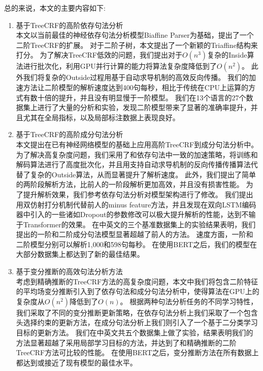总的来说，本文的主要内容如下:
\begin{enumerate}
	\item 基于TreeCRF的高阶依存句法分析\\
	      \indent 本文以当前最佳的神经依存句法分析模型Biaffine Parser为基础，提出了一个二阶TreeCRF的扩展。
	      对于二阶子树，本文提出了一个新颖的Triaffine结构来打分。
	      为了解决TreeCRF低效的问题，我们提出对于$O(n^3)$复杂的Inside算法进行批次化，利用GPU并行计算的能力将算法复杂度降低到了$O(n^2)$。
	      此外我们将复杂的Outside过程用基于自动求导机制的高效反向传播。
	      我们的加速方法让二阶模型的解析速度达到400句每秒，相比于传统在CPU上运算的方式有数十倍的提升，并且没有明显慢于一阶模型。
	      我们在13个语言的27个数据集上进行了大量的分析和实验，发现二阶模型带来了显著的准确率提升，并且尤其在全局指标，以及局部标注数据上表现良好。
	\item 基于TreeCRF的高阶成分句法分析\\
	      \indent 本文提出在已有神经网络模型的基础上应用高阶TreeCRF到成分句法分析中。
	      为了解决高复杂度问题，我们采用了和依存句法中一致的加速策略，将训练和解码算法进行了高度批次化，并且用支持自动求导机制的反向传播传播算法代替了复杂的Outside算法，从而显著提升了解析速度。
	      此外，我们提出了简单的两阶段解析方法，比前人的一阶段解析更加高效，并且没有损害性能。
	      为了提升解析效果，我们参考依存句法分析对模型架构进行了修改。
	      我们提出用双仿射打分机制代替前人的minus feature方法，并且发现在双向LSTM编码器中引入的一些诸如Dropout的参数修改可以极大提升解析的性能，达到不输于Transformer的效果。
	      在中英文的三个基准数据集上的实验结果表明，我们提出的一阶和二阶成分句法模型显著超越了前人的方法。
	      速度方面，一阶和二阶模型分别可以解析1,000和598句每秒。
	      在使用BERT之后，我们的模型在大部分数据集上都达到了新的最佳结果。
	\item 基于变分推断的高效句法分析方法\\
	      \indent 考虑到精确推断的TreeCRF方法的高复杂度问题，本文中我们将包含二阶特征的平均场变分推断引入到了依存句法和成分句法分析中，使得算法在GPU上的复杂度从$O(n^2)$降低到了$O(n)$。
	      根据两种句法分析任务的不同学习特性，我们采取了不同的变分推断更新策略，在依存句法分析上我们采取了一个包含头选择约束的更新方法，在成分句法分析上我们则引入了一个基于二分类学习目标的更新方法。
	      我们在中英文共五个数据集上做了实验，结果表明我们的方法显著超越了采用局部学习目标的方法，并达到了和精确推断的二阶TreeCRF方法可比较的性能。
	      在使用BERT之后，变分推断方法在所有数据上都达到或接近了现有模型的最佳水平。
\end{enumerate}

